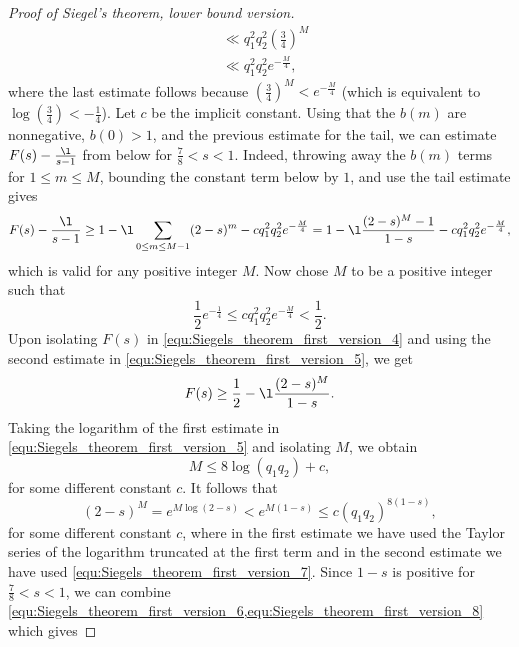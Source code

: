 \begin{proof}[Proof of Siegel's theorem, lower bound version]
\begin{align*}
          &\ll q_{1}^{2}q_{2}^{2}\left(\frac{3}{4}\right)^{M} \\
          &\ll q_{1}^{2}q_{2}^{2}e^{-\frac{M}{4}},
        \end{align*}
        where the last estimate follows because $(\frac{3}{4})^{M} < e^{-\frac{M}{4}}$ (which is equivalent to $\log\left(\frac{3}{4}\right) < -\frac{1}{4}$). Let $c$ be the implicit constant. Using that the $b(m)$ are nonnegative, $b(0) > 1$, and the previous estimate for the tail, we can estimate $F(s)-\frac{\l}{s-1}$ from below for $\frac{7}{8} < s < 1$. Indeed, throwing away the $b(m)$ terms for $1 \le m \le M$, bounding the constant term below by $1$, and use the tail estimate gives
        \begin{equation}\label{equ:Siegels_theorem_first_version_4}
          F(s)-\frac{\l}{s-1} \ge 1-\l\sum_{0 \le m \le M-1}(2-s)^{m}-cq_{1}^{2}q_{2}^{2}e^{-\frac{M}{4}} = 1-\l\frac{(2-s)^{M}-1}{1-s}-cq_{1}^{2}q_{2}^{2}e^{-\frac{M}{4}},
        \end{equation}
        which is valid for any positive integer $M$. Now chose $M$ to be a positive integer such that
        \begin{equation}\label{equ:Siegels_theorem_first_version_5}
          \frac{1}{2}e^{-\frac{1}{4}} \le cq_{1}^{2}q_{2}^{2}e^{-\frac{M}{4}} < \frac{1}{2}.
        \end{equation}
        Upon isolating $F(s)$ in \cref{equ:Siegels_theorem_first_version_4} and using the second estimate in \cref{equ:Siegels_theorem_first_version_5}, we get
        \begin{equation}\label{equ:Siegels_theorem_first_version_6}
          F(s) \ge \frac{1}{2}-\l\frac{(2-s)^{M}}{1-s}.
        \end{equation}
        Taking the logarithm of the first estimate in \cref{equ:Siegels_theorem_first_version_5} and isolating $M$, we obtain
        \begin{equation}\label{equ:Siegels_theorem_first_version_7}
          M \le 8\log(q_{1}q_{2})+c,
        \end{equation}
        for some different constant $c$. It follows that
        \begin{equation}\label{equ:Siegels_theorem_first_version_8}
          (2-s)^{M} = e^{M\log(2-s)} < e^{M(1-s)} \le c(q_{1}q_{2})^{8(1-s)},
        \end{equation}
        for some different constant $c$, where in the first estimate we have used the Taylor series of the logarithm truncated at the first term and in the second estimate we have used \cref{equ:Siegels_theorem_first_version_7}. Since $1-s$ is positive for $\frac{7}{8} < s < 1$, we can combine \cref{equ:Siegels_theorem_first_version_6,equ:Siegels_theorem_first_version_8} which gives

\end{proof}
